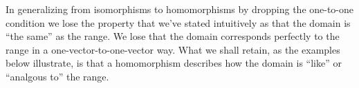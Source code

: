 
In generalizing from isomorphisms to homomorphisms by 
dropping the one-to-one condition
we lose the property that we've stated intuitively as that the 
domain is ``the same'' as the range.
We lose that the domain
corresponds perfectly to the range
in a one-vector-to-one-vector way.
What we shall retain, as the examples below illustrate,
is that a homomorphism describes how
the domain is ``like'' or ``analgous to'' the range.

